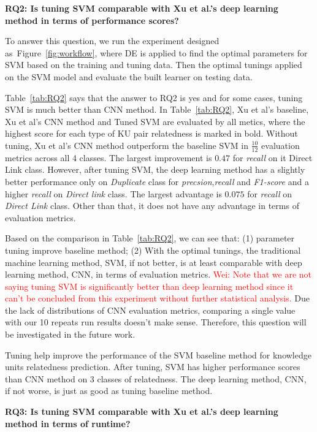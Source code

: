 \documentclass[sigconf,review, anonymous]{acmart}
\theoremstyle{break}
\newcommand{\wei}[1]{\textcolor{red}{Wei: #1}}
\newcommand{\fig}[1]{Figure~\ref{fig:#1}}
\newcommand{\tab}[1]{Table~\ref{tab:#1}}
\begin{document}
\textbf{RQ2: Is tuning SVM comparable with Xu et al.'s deep learning method in terms of performance scores?}

To answer this question, we run the experiment designed as~\fig{workflow}, where DE is applied to 
find the optimal parameters for SVM based on the training and tuning data. Then the optimal tunings
applied on the SVM model and evaluate the built learner on testing data.

\tab{RQ2} says that the answer to RQ2 is yes and for some cases, tuning SVM is much better than
CNN method. In \tab{RQ2},  Xu et al's baseline, Xu et al's CNN method and Tuned SVM are
evaluated by all metics, where the highest score for each type of KU pair
relatedness is marked in bold.  Without tuning, Xu et al's CNN method outperform
the baseline SVM in $\frac{10}{12}$ evaluation metrics across all 4 classes. 
The largest improvement is $0.47$ for {\it recall} on {it Direct Link} class. However, after tuning SVM, the deep learning
method has a slightly better performance only on {\it Duplicate} class for {\it precsion},{\it recall} and {\it F1-score} and 
 a higher {\it recall} on {\it Direct link} class. The largest advantage is $0.075$ for {\it recall} on {\it Direct Link} class.
 Other than that, it does not have any advantage in terms of evaluation
 metrics.
 
 Based on the comparison in \tab{RQ2}, we can see that: (1) parameter tuning improve baseline method;
 (2) With the optimal tunings, the traditional machine learning method, SVM, if not better, is at least comparable 
 with deep learning method, CNN, in terms of evaluation metrics.  \wei{Note that we are not saying tuning SVM is significantly
 better than deep learning method since it can't be concluded from this experiment without further statistical analysis.}
 Due the lack of distributions of CNN evaluation metrics, comparing a single value with our 10 repeats run results doesn't
 make sense. Therefore, this question will be investigated in the future work.
 
 
 \begin{lesson}
 Tuning help improve the performance of the  SVM baseline method for knowledge units relatedness prediction.
 After tuning, SVM has higher performance scores than CNN method on 3 classes of relatedness.
 The deep learning method, CNN, if not worse, is just as good as tuning baseline method.
 \end{lesson}
 

\textbf{ RQ3: Is tuning SVM comparable with Xu et al.'s deep learning method in terms of runtime?}
 
\end{document}
